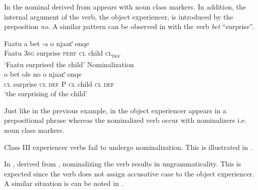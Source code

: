 \documentclass[output=paper]{langscibook}
\begin{document}
In  the  nominal derived from  appears with noun class markers. In addition, the internal argument of the verb, the object experiencer, is introduced by the preposition \textit{no}.  A similar pattern can be observed in  with the verb \textit{bet} “surprise”.

\ea \label{ex:tamba:15}
\ea \label{ex:tamba:15a}
\gll Faatu a      bet    {}-a        o        njaaƈ onqe\\
Faatu \textsc{3sg}  surprise \textsc{perf}   \textsc{cl}     child   \textsc{cl\textsubscript{def}} \\
\glt `Faatu surprised the child'
\ex Nominalization\\ \label{ex:tamba:15b}
\gll o     bet        ole      no o    njaaƈ   onqe\\
\textsc{cl}   surprise  \textsc{cl\textsubscript{} \textsc{def}}   P  \textsc{cl}  child     \textsc{cl\textsubscript{} \textsc{def}}\\
\glt `the surprising of the child'
\z
\z

Just like in the previous example, in  the object experiencer appears in a prepositional phrase whereas the nominalized verb occur with nominalizers i.e. noun class markers. 

 Class III experiencer verbs fail to undergo nominalization. This  is illustrated in  .


\ea \label{ex:tamba:16}
\label{ex:tamba:16a}
\label{ex:tamba:16b}
\z
\z
 
In , derived from , nominalizing the verb results in ungrammaticality. This is expected since the verb does not assign accusative case to the object experiencer. A similar situation is can be noted in .

\ea \label{ex:tamba:17}
\label{ex:tamba:17a}
\label{ex:tamba:17b}
\z
\z
\end{document}
